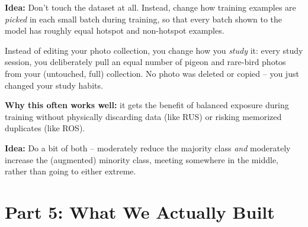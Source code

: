 \documentclass[11pt]{article}
\begin{document}
\begin{keyidea}
\textbf{Idea:} Don't touch the dataset at all. Instead, change how
training examples are \emph{picked} in each small batch during
training, so that every batch shown to the model has roughly equal
hotspot and non-hotspot examples.
\begin{analogy}
Instead of editing your photo collection, you change how you
\emph{study} it: every study session, you deliberately pull an equal
number of pigeon and rare-bird photos from your (untouched, full)
collection. No photo was deleted or copied -- you just changed your
study habits.
\end{analogy}
\textbf{Why this often works well:} it gets the benefit of balanced
exposure during training without physically discarding data (like
RUS) or risking memorized duplicates (like ROS).
\end{keyidea}

\begin{keyidea}
\textbf{Idea:} Do a bit of both -- moderately reduce the majority
class \emph{and} moderately increase the (augmented) minority class,
meeting somewhere in the middle, rather than going to either extreme.
\end{keyidea}

\section{Part 5: What We Actually Built}
\end{document}
